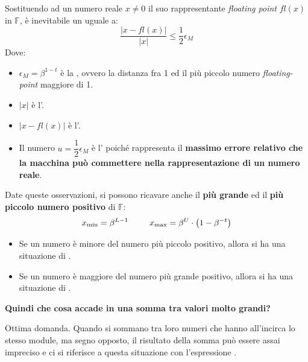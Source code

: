 \highspace
Sostituendo ad un numero reale $x \ne 0$ il suo rappresentante \emph{floating point} $fl\left(x\right)$ in $\mathbb{F}$, è inevitabile un  uguale a:
\begin{equation}
    \dfrac{
        \left| x - fl(x) \right|
    }{
        \left| x \right|
    } \le \dfrac{1}{2} \epsilon_{M}
\end{equation}
Dove:
\begin{itemize}
    \item $\epsilon_{M} = \beta^{1-t}$ è la , ovvero la distanza fra 1 ed il più piccolo numero \emph{floating-point} maggiore di 1.
    
    \item $\left| x \right|$ è l'.

    \item $\left| x - fl(x) \right|$ è l'.

    \item Il numero $u = \dfrac{1}{2} \epsilon_{M}$ è l' poiché rappresenta il \textbf{massimo errore relativo che la macchina può commettere nella rappresentazione di un numero reale}.
\end{itemize}
Date queste osservazioni, si possono ricavare anche il \textbf{più grande} ed il \textbf{più piccolo numero positivo} di $\mathbb{F}$:
\begin{equation*}
    x_{\text{min}} = \beta^{L-1} \hspace{2.5em} x_{\text{max}} = \beta^{U} \cdot \left(1 - \beta^{-t}\right)
\end{equation*}
\begin{itemize}
    \item Se un numero è minore del numero più piccolo positivo, allora si ha una situazione di .
    \item Se un numero è maggiore del numero più grande positivo, allora si ha una situazione di .
\end{itemize}

\begin{flushleft}
    \textcolor{Green3}{ \textbf{Quindi che cosa accade in una somma tra valori molto grandi?}}
\end{flushleft}
Ottima domanda. Quando si sommano tra loro numeri che hanno all'incirca lo stesso module, ma segno opposto, il risultato della somma può essere assai impreciso e ci si riferisce a questa situazione con l'espressione .

